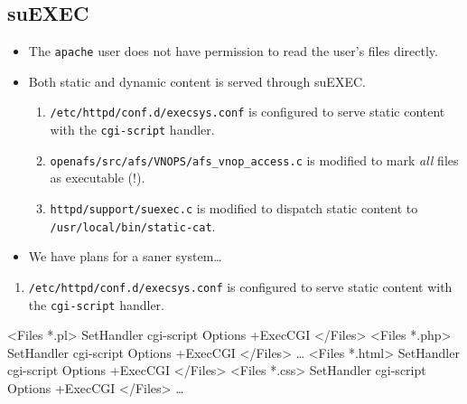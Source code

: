 \subsection{suEXEC}

\begin{frame}
  \begin{itemize}
  \item The \texttt{apache} user does not have permission to read the
    user's files directly.
  \item Both static and dynamic content is served through suEXEC.
    \pause
    \begin{enumerate}
    \item \texttt{/etc/httpd/conf.d/execsys.conf} is configured to
      serve static content with the \texttt{cgi-script} handler.
    \item \texttt{openafs/src/afs/VNOPS/afs\_vnop\_access.c} is modified
      to mark \emph{all} files as executable (!).
    \item \texttt{httpd/support/suexec.c} is modified to dispatch
      static content to \texttt{/usr/local/bin/static-cat}.
    \end{enumerate}
  \item We have plans for a saner system\ldots
  \end{itemize}
\end{frame}

\begin{frame}[fragile,t]
  \begin{enumerate}
  \item \texttt{/etc/httpd/conf.d/execsys.conf} is configured to serve
    static content with the \texttt{cgi-script} handler.
  \end{enumerate}
\begin{footnotesize}
\begin{semiverbatim}
<Files *.pl>
        SetHandler cgi-script
        Options +ExecCGI
</Files>
<Files *.php>
        SetHandler cgi-script
        Options +ExecCGI
</Files>
\ldots
<Files *.html>
        SetHandler cgi-script
        Options +ExecCGI
</Files>
<Files *.css>
        SetHandler cgi-script
        Options +ExecCGI
</Files>
\ldots
\end{semiverbatim}
\end{footnotesize}
\end{frame}

